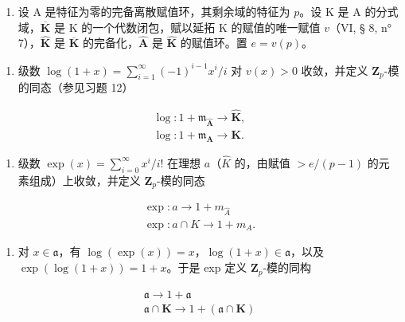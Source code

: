 \begin{enumerate}
\def\labelenumi{\arabic{enumi})}
\setcounter{enumi}{12}
\tightlist
\item
  设 A 是特征为零的完备离散赋值环，其剩余域的特征为 \(p\)。设 K 是 A 的分式域，\(\overline{\mathbf{K}}\) 是 K 的一个代数闭包，赋以延拓 K 的赋值的唯一赋值 \(v\)（VI, § 8, n° 7），\(\hat{\mathbf{K}}\) 是 \(\overline{\mathbf{K}}\) 的完备化，\(\hat{\mathbf{A}}\) 是 \(\hat{\mathbf{K}}\) 的赋值环。置 \(e = v(p)\)。
\end{enumerate}

\begin{enumerate}
\def\labelenumi{\alph{enumi})}
\tightlist
\item
  级数 \(\log(1 + x) = \sum_{i=1}^{\infty} (-1)^{i-1} x^i / i\) 对 \(v(x) > 0\) 收敛，并定义 \(\mathbf{Z}_p\)-模的同态（参见习题 12）
\end{enumerate}

\[
\begin{array}{l} \log : 1 + \mathfrak {m} _ {\hat {\mathbf {A}}} \to \hat {\mathbf {K}}, \\ \log : 1 + \mathfrak {m} _ {\mathbf {A}} \to \mathbf {K}. \end{array}
\]

\begin{enumerate}
\def\labelenumi{\alph{enumi})}
\setcounter{enumi}{1}
\tightlist
\item
  级数 \(\exp(x) = \sum_{i=0}^{\infty} x^{i}/i!\) 在理想 \(a\)（\(\hat{K}\) 的，由赋值 \(>e/(p-1)\) 的元素组成）上收敛，并定义 \(\mathbf{Z}_{p}\)-模的同态
\end{enumerate}

\[
\begin{array}{l} \exp : a \to 1 + m _ {\hat {A}} \\ \exp : a \cap K \to 1 + m _ {A}. \end{array}
\]

\begin{enumerate}
\def\labelenumi{\alph{enumi})}
\setcounter{enumi}{2}
\tightlist
\item
  对 \(x \in \mathfrak{a}\)，有 \(\log(\exp(x)) = x\)，\(\log(1 + x) \in \mathfrak{a}\)，以及 \(\exp(\log(1 + x)) = 1 + x\)。于是 exp 定义 \(\mathbf{Z}_p\)-模的同构
\end{enumerate}

\[
\begin{array}{l}\mathfrak {a} \rightarrow 1 + \mathfrak {a}\\\mathfrak {a} \cap \mathbf {K} \rightarrow 1 + (\mathfrak {a} \cap \mathbf {K})\end{array}
\]

